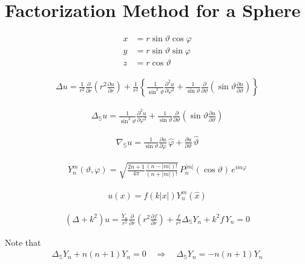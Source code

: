 \chapter{Factorization Method for a Sphere}

\begin{align*}
  x &= r\sin\vartheta\cos\varphi \\
  y &= r\sin\vartheta\sin\varphi \\
  z &= r\cos\vartheta
\end{align*}

\begin{align*}
  \Delta u = \frac{1}{r^2}\frac{\partial}{\partial r}\left(r^2\frac{\partial u}{\partial r}\right) + \frac{1}{r^2}\left\{\frac{1}{\sin^2\vartheta}\frac{\partial^2 u}{\partial\varphi^2} + \frac{1}{\sin\vartheta}\frac{\partial}{\partial\vartheta}\left(\sin\vartheta\frac{\partial u}{\partial\vartheta}\right)\right\} 
\end{align*}

\begin{align*}
  \Delta_{\mathbb{S}} u = \frac{1}{\sin^2\vartheta}\frac{\partial^2 u}{\partial\varphi^2} + \frac{1}{\sin\vartheta}\frac{\partial}{\partial\vartheta}\left(\sin\vartheta\frac{\partial u}{\partial\vartheta}\right)
\end{align*}

\begin{align*}
  \nabla_{\mathbb{S}} u = \frac{1}{\sin\vartheta}\frac{\partial u}{\partial\varphi}\,\hat{\varphi} + \frac{\partial u}{\partial\vartheta}\,\hat{\vartheta}
\end{align*}

\begin{align*}
  Y_n^m(\vartheta,\varphi) = \sqrt{\frac{2n+1}{4\pi}\frac{(n-|m|)!}{(n+|m|)!}}\,P_n^{|m|}(\cos\vartheta)\,e^{im\varphi}
\end{align*}

\begin{align*}
  u(x) = f(k|x|)Y_n^m(\hat{x})
\end{align*}

\begin{align*}
  \left(\Delta + k^2\right)u = \frac{Y_n}{r^2}\frac{\partial}{\partial r}\left(r^2\frac{\partial f}{\partial r}\right) + \frac{f}{r^2}\Delta_{\mathbb{S}}Y_n + k^2 f\,Y_n = 0 
\end{align*}

Note that
\begin{align*}
  \Delta_{\mathbb{S}} Y_n + n(n+1) Y_n = 0\quad\Longrightarrow\quad\Delta_{\mathbb{S}} Y_n = -n(n+1) Y_n
\end{align*}

